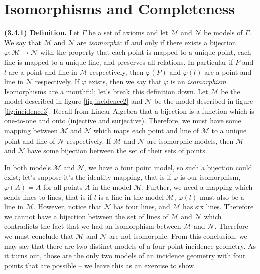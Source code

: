 \documentclass[12pt]{book}
\def\cM{{\mathcal{M}}}
\def\cN{{\mathcal{N}}}
\def\header #1{\noindent\textbf{#1}}
\begin{document}
\section{Isomorphisms and Completeness}

\header{(3.4.1) Definition.} Let $\Gamma$ be a set of axioms and let $\cM$ and $\cN$ be models of $\Gamma$. We say that $\cM$ and $\cN$ are \textit{isomorphic} if and only if there exists a bijection $\varphi\colon\cM\rightarrow\cN$ with the property that each point is mapped to a unique point, each line is mapped to a unique line, and preserves all relations. In particular if $P$ and $l$ are a point and line in $\cM$ respectively, then $\varphi(P)$ and $\varphi(l)$ are a point and line in $\cN$ respectively. If $\varphi$ exists, then we say that $\varphi$ is an \textit{isomorphism}.\\

	Isomorphisms are a mouthful; let's break this definition down. Let $\cM$ be the model described in figure \ref{fig:incidence2} and $\cN$ be the model described in figure \ref{fig:incidence3}. Recall from Linear Algebra that a bijection is a function which is one-to-one and onto (injective and surjective). Therefore, we must have some mapping between $\cM$ and $\cN$ which maps each point and line of $\cM$ to a unique point and line of $\cN$ respectively. If $\cM$ and $\cN$ are isomorphic models, then $\cM$ and $\cN$ have some bijection between the set of their sets of points. 

	In both models $\cM$ and $\cN$, we have a four point model, so such a bijection could exist; let's suppose it's the identity mapping, that is if $\varphi$ is our isomorphism, $\varphi(A)=A$ for all points $A$ in the model $\cM$. Further, we need a mapping which sends lines to lines, that is if $l$ is a line in the model $\cM$, $\varphi(l)$ must also be a line in $\cM$. However, notice that $\cN$ has four lines, and $\cM$ has six lines. Therefore we cannot have a bijection between the set of lines of $\cM$ and $\cN$ which contradicts the fact that we had an isomorphism between $\cM$ and $\cN$. Therefore we must conclude that $\cM$ and $\cN$ are not isomorphic. From this conclusion, we may say that there are two distinct models of a four point incidence geometry. As it turns out, those are the only two models of an incidence geometry with four points that are possible -- we leave this as an exercise to show. 
	
\end{document}
